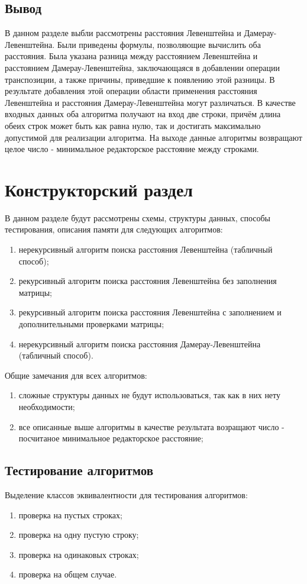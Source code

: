 \section{Вывод}
В данном разделе выбли рассмотрены расстояния Левенштейна и Дамерау-Левенштейна. Были приведены формулы, позволяющие вычислить оба расстояния. Была указана разница между расстоянием Левенштейна и расстоянием Дамерау-Левенштейна, заключающаяся в добавлении операции транспозиции, а также причины, приведшие к появлению этой разницы. В результате добавления этой операции области применения расстояния Левенштейна и расстояния Дамерау-Левенштейна могут различаться. В качестве входных данных оба алгоритма получают на вход две строки, причём длина обеих строк может быть как равна нулю, так и достигать максимально допустимой для реализации алгоритма. На выходе данные алгоритмы возвращают целое число - минимальное редакторское расстояние между строками.

\chapter{Конструкторский раздел}

В данном разделе будут рассмотрены схемы, структуры данных, способы тестирования, описания памяти для следующих алгоритмов:
\begin{enumerate}
	\item нерекурсивный алгоритм поиска расстояния Левенштейна (табличный
способ);
	\item рекурсивный алгоритм поиска расстояния Левенштейна без заполнения
матрицы;
	\item рекурсивный алгоритм поиска расстояния Левенштейна с заполнением
и дополнительными проверками матрицы;
	\item нерекурсивный алгоритм поиска расстояния Дамерау-Левенштейна
(табличный способ).
\end{enumerate}

Общие замечания для всех алгоритмов:
\begin{enumerate}
	\item сложные структуры данных не будут использоваться, так как в них нету необходимости;
	\item все описанные выше алгоритмы в качестве результата возращают число - посчитаное минимальное редакторское расстояние;
\end{enumerate}

\section{Тестирование алгоритмов}
Выделение классов эквивалентности для тестирования алгоритмов:
\begin{enumerate}
	\item проверка на пустых строках;
	\item проверка на одну пустую строку;
	\item проверка на одинаковых строках;
	\item проверка на общем случае.
\end{enumerate}

